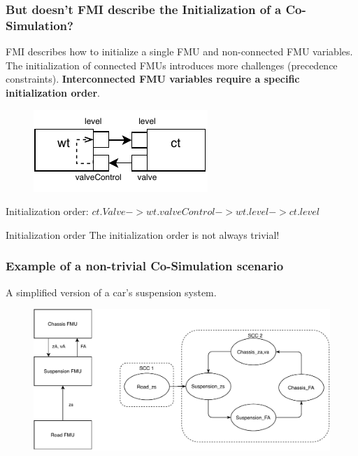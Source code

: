 \documentclass{beamer}
\begin{document}
\begin{frame}
\frametitle{But doesn't FMI describe the Initialization of a Co-Simulation?}
FMI describes how to initialize a single FMU and non-connected FMU variables.
The initialization of connected FMUs introduces more challenges (precedence constraints).
\textbf{Interconnected FMU variables require a specific initialization order}.

\begin{figure}
    \centering
    \includegraphics[scale=1.5]{images/ExpansionPlugin-Page-3.pdf}
\end{figure}
Initialization order: $ct.Valve -> wt.valveControl -> wt.level -> ct.level$
\begin{alertblock}{Initialization order} 
    The initialization order is not always trivial! 
\end{alertblock}
\end{frame}

\begin{frame}
\frametitle{Example of a non-trivial Co-Simulation scenario}
A simplified version of a car's suspension system.
\begin{figure}
    \centering
    \includegraphics[scale=0.6]{images/quarter_car_SCC.pdf}
    \label{fig:SCC_quarter}
\end{figure}
\end{frame}
\end{document}
